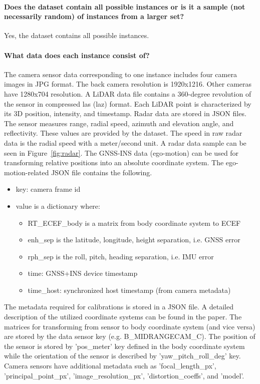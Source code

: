 \documentclass{article}
\begin{document}
\paragraph{Does the dataset contain all possible instances or is it a sample (not necessarily random) of instances from a larger set?} Yes, the dataset contains all possible instances.

\paragraph{What data does each instance consist of?} The camera sensor data corresponding to one instance includes four camera images in JPG format. The back camera resolution is 1920x1216. Other cameras have 1280x704 resolution. A LiDAR data file contains a 360-degree revolution of the sensor in compressed las (laz) format. Each LiDAR point is characterized by its 3D position, intensity, and timestamp.
Radar data are stored in JSON files. The sensor measures range, radial speed, azimuth and elevation angle, and reflectivity. These values are provided by the dataset. The speed in raw radar data is the radial speed with a meter/second unit. A radar data sample can be seen in Figure~\ref{fig:radar}. The GNSS-INS data (ego-motion) can be used for transforming relative positions into an absolute coordinate system. The ego-motion-related JSON file contains the following.

\begin{itemize}
  \item key: camera frame id
  \item value is a dictionary where:
  \begin{itemize}
    \item RT\_ECEF\_body is a matrix from body coordinate system to ECEF
    \item enh\_sep is the latitude, longitude, height separation, i.e. GNSS error
    \item rph\_sep is the roll, pitch, heading separation, i.e. IMU error
    \item time: GNSS+INS device timestamp
    \item time\_host: synchronized host timestamp (from camera metadata)
  \end{itemize}
\end{itemize}

The metadata required for calibrations is stored in a JSON file. A detailed description of the utilized coordinate systems can be found in the paper. The matrices for transforming from sensor to body coordinate system (and vice versa) are stored by the data sensor key (e.g. B\_MIDRANGECAM\_C). The position of the sensor is stored by 'pos\_meter' key defined in the body coordinate system while the orientation of the sensor is described by 'yaw\_pitch\_roll\_deg' key. Camera sensors have additional metadata such as 'focal\_length\_px', 'principal\_point\_px', 'image\_resolution\_px', 'distortion\_coeffs', and 'model'.
\end{document}
